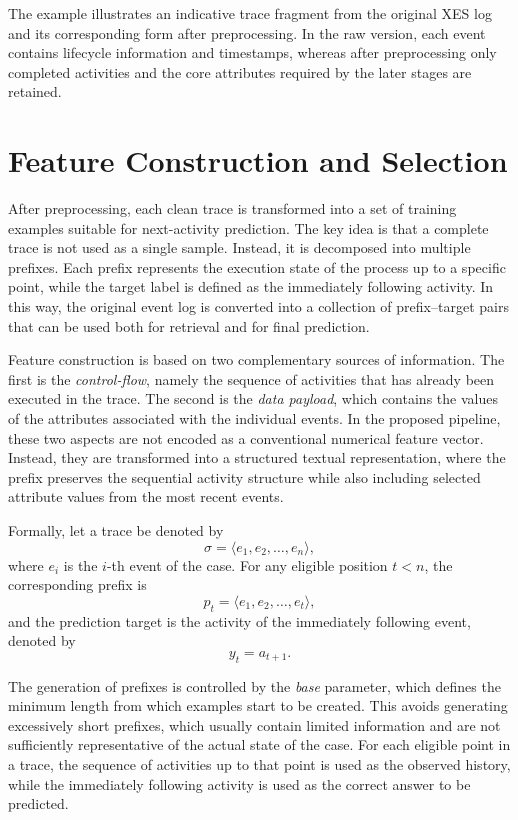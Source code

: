 \noindent
The example illustrates an indicative trace fragment from the
original XES log and its corresponding form after preprocessing. In the raw
version, each event contains lifecycle information and timestamps, whereas
after preprocessing only completed activities and the core attributes required
by the later stages are retained.

\section{Feature Construction and Selection}
After preprocessing, each clean trace is transformed into a set of training
examples suitable for next-activity prediction. The key idea is that a
complete trace is not used as a single sample. Instead, it is decomposed into
multiple prefixes. Each prefix represents the execution state of the process
up to a specific point, while the target label is defined as the immediately
following activity. In this way, the original event log is converted into a
collection of prefix--target pairs that can be used both for retrieval and
for final prediction.

\indent Feature construction is based on two complementary sources of
information. The first is the \textit{control-flow}, namely the sequence of
activities that has already been executed in the trace. The second is the
\textit{data payload}, which contains the values of the attributes associated
with the individual events. In the proposed pipeline, these two aspects are
not encoded as a conventional numerical feature vector. Instead, they are
transformed into a structured textual representation, where the prefix
preserves the sequential activity structure while also including selected
attribute values from the most recent events.

\indent Formally, let a trace be denoted by
\[
\sigma = \langle e_1, e_2, \dots, e_n \rangle,
\]
where \(e_i\) is the \(i\)-th event of the case. For any eligible position
\(t < n\), the corresponding prefix is
\[
p_t = \langle e_1, e_2, \dots, e_t \rangle,
\]
and the prediction target is the activity of the immediately following event,
denoted by
\[
y_t = a_{t+1}.
\]

\indent The generation of prefixes is controlled by the \textit{base}
parameter, which defines the minimum length from which examples start to be
created. This avoids generating excessively short prefixes, which usually
contain limited information and are not sufficiently representative of the
actual state of the case. For each eligible point in a trace, the sequence of
activities up to that point is used as the observed history, while the
immediately following activity is used as the correct answer to be predicted.

